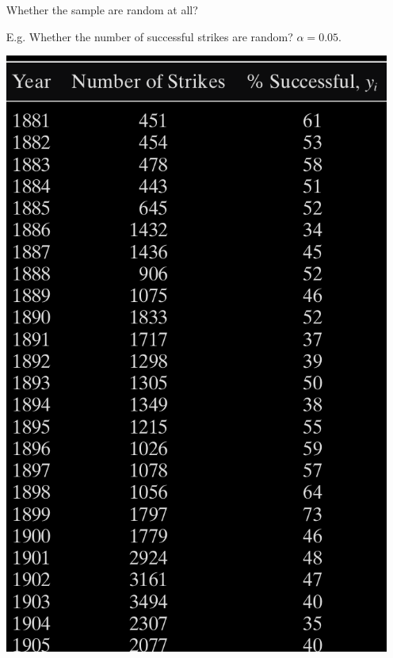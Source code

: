 \begin{frame}
	\begin{itemize}
		\item[] Whether the sample are random at all?
		\item[E.g.] Whether the number of successful strikes are random? $\alpha=0.05$.
		\begin{center}
			\includegraphics[scale=0.2]{Codes/Table14-6-1_1.png}
		\end{center}
	\end{itemize}
\end{frame}
